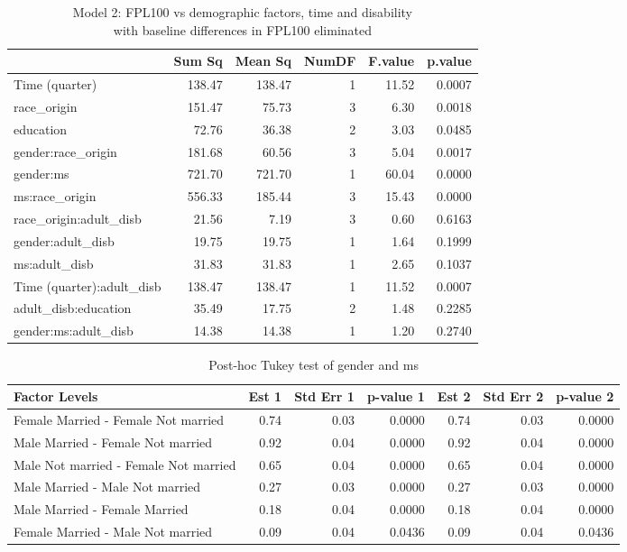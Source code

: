 \documentclass[11pt]{extarticle} %
\begin{document}
\noindent
\begin{table}[H]
\footnotesize
\centering
\begin{tabular}{lrrrrr}
  \hline
 & Sum Sq & Mean Sq & NumDF & F.value & p.value \\ 
  \hline
  Time (quarter) & 138.47 & 138.47 & 1 & 11.52 & 0.0007 \\ 
  race\_origin & 151.47 & 75.73 & 3 & 6.30 & 0.0018 \\ 
  education & 72.76 & 36.38 & 2 & 3.03 & 0.0485 \\ 
  gender:race\_origin & 181.68 & 60.56 & 3 & 5.04 & 0.0017 \\ 
  gender:ms & 721.70 & 721.70 & 1 & 60.04 & 0.0000 \\ 
  ms:race\_origin & 556.33 & 185.44 & 3 & 15.43 & 0.0000 \\ 
  race\_origin:adult\_disb & 21.56 & 7.19 & 3 & 0.60 & 0.6163 \\ 
  gender:adult\_disb & 19.75 & 19.75 & 1 & 1.64 & 0.1999 \\ 
  ms:adult\_disb & 31.83 & 31.83 & 1 & 2.65 & 0.1037 \\ 
  Time (quarter):adult\_disb & 138.47 & 138.47 & 1 & 11.52 & 0.0007 \\ 
  adult\_disb:education & 35.49 & 17.75 & 2 & 1.48 & 0.2285 \\ 
  gender:ms:adult\_disb & 14.38 & 14.38 & 1 & 1.20 & 0.2740 \\ 
   \hline
\end{tabular}
\caption{Model 2: FPL100 vs demographic factors, time and disability \\ with baseline differences in FPL100 eliminated} 
\label{tab:Table2Anova2}
\end{table}

\begin{table}[H]
\footnotesize
\centering
\begin{tabular}{lrrrrrr}
  \hline
Factor Levels & Est 1 & Std Err 1 & p-value 1 & Est 2 & Std Err 2 & p-value 2 \\ 
  \hline
  Female Married -  Female Not married & 0.74 & 0.03 & 0.0000 & 0.74 & 0.03 & 0.0000 \\ 
    Male Married -  Female Not married & 0.92 & 0.04 & 0.0000 & 0.92 & 0.04 & 0.0000 \\ 
    Male Not married -  Female Not married & 0.65 & 0.04 & 0.0000 & 0.65 & 0.04 & 0.0000 \\ 
    Male Married -  Male Not married & 0.27 & 0.03 & 0.0000 & 0.27 & 0.03 & 0.0000 \\ 
    Male Married -  Female Married & 0.18 & 0.04 & 0.0000 & 0.18 & 0.04 & 0.0000 \\ 
    Female Married -  Male Not married & 0.09 & 0.04 & 0.0436 & 0.09 & 0.04 & 0.0436 \\ 
   \hline
\end{tabular}
\caption{Post-hoc Tukey test of gender and ms}
\label{tab:Table3GenderMS}
\end{table}
\end{document}
